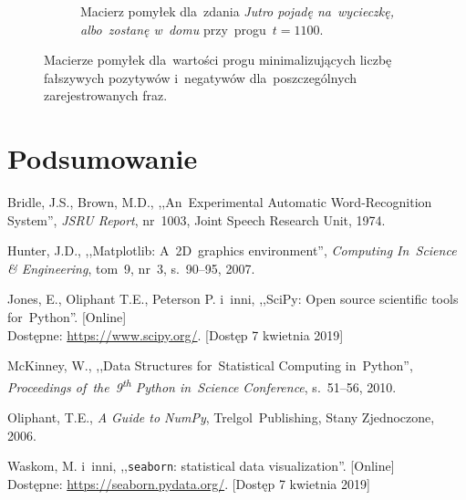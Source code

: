 \documentclass[11pt,a4paper]{article}
\begin{document}
\begin{figure}
\begin{subfigure}[t]{0.45\textwidth}
        \caption{Macierz pomyłek dla~zdania \emph{Jutro pojadę na~wycieczkę, albo~zostanę w~domu} przy~progu~$t = 1100$.}
    \end{subfigure}
    \caption{Macierze pomyłek dla~wartości progu minimalizujących liczbę fałszywych pozytywów i~negatywów dla~poszczególnych zarejestrowanych fraz.}
\end{figure}

\section{Podsumowanie}

\begin{thebibliography}{9}

        Bridle, J.S.,
        Brown, M.D.,
        ,,An~Experimental Automatic Word-Recognition System'',
        \emph{JSRU Report},
        nr~1003,
        Joint Speech Research Unit,
        1974.

        Hunter, J.D.,
        ,,Matplotlib: A~2D~graphics environment'',
        \emph{Computing In~Science \& Engineering},
        tom~9,
        nr~3,
        s.~90--95,
        2007.

        Jones, E., Oliphant T.E., Peterson P. i~inni,
        ,,SciPy: Open source scientific tools for~Python''.
        [Online]
        \\
        Dostępne: \url{https://www.scipy.org/}.
        [Dostęp 7 kwietnia 2019]

        McKinney, W.,
        ,,Data Structures for~Statistical Computing in~Python'',
        \emph{Proceedings of~the~9\textsuperscript{th} Python in~Science Conference},
        s.~51--56,
        2010.

        Oliphant, T.E.,
        \emph{A Guide to NumPy},
        Trelgol~Publishing,
        Stany Zjednoczone,
        2006.

        Waskom, M. i~inni,
        ,,\texttt{seaborn}: statistical data visualization''.
        [Online]
        \\
        Dostępne: \url{https://seaborn.pydata.org/}.
        [Dostęp 7 kwietnia 2019]


\end{thebibliography}
\end{document}
